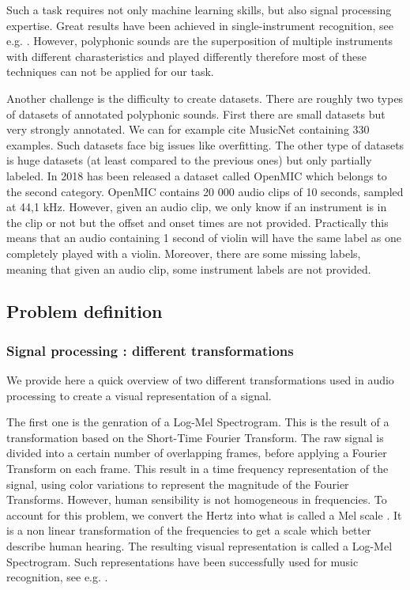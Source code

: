 \documentclass[final]{cvpr}
\begin{document}
Such a task requires not only machine learning skills, but also signal processing expertise. Great results have been achieved in single-instrument recognition, see e.g. \cite{mir}. However, polyphonic sounds are the superposition of multiple instruments with different charasteristics and played differently therefore most of these techniques can not be applied for our task.

Another challenge is the difficulty to create datasets. There are roughly two types of datasets of annotated polyphonic sounds. First there are small datasets but very strongly annotated. We can for example cite MusicNet \cite{MusicNet} containing 330 examples. Such datasets face big issues like overfitting. The other type of datasets is huge datasets (at least compared to the previous ones) but only partially labeled. In 2018 has been released a dataset called OpenMIC \cite{MIC} which belongs to the second category. OpenMIC contains 20 000 audio clips of 10 seconds, sampled at 44,1 kHz. However, given an audio clip, we only know if an instrument is in the clip or not but the offset and onset times are not provided. Practically this means that an audio containing 1 second of violin will have the same label as one completely played with a violin. Moreover, there are some missing labels, meaning that given an audio clip, some instrument labels are not provided. 
\subsection{Problem definition}
\subsubsection{Signal processing : different transformations}
We provide here a quick overview of two different transformations used in audio processing to create a visual representation of a signal.

The first one is the genration of a Log-Mel Spectrogram. This is the result of a transformation based on the Short-Time Fourier Transform. The raw signal is divided into a certain number of overlapping frames, before applying a Fourier Transform on each frame. This result in a time frequency representation of the signal, using color variations to represent the magnitude of the Fourier Transforms. However, human sensibility is not homogeneous in frequencies. To account for this problem, we convert the Hertz into what is called a Mel scale \cite{mel}. It is a non linear transformation of the frequencies to get a scale which better describe human hearing. The resulting visual representation is called a Log-Mel Spectrogram. Such representations have been successfully used for music recognition, see e.g. \cite{spectrogram}.
\end{document}
